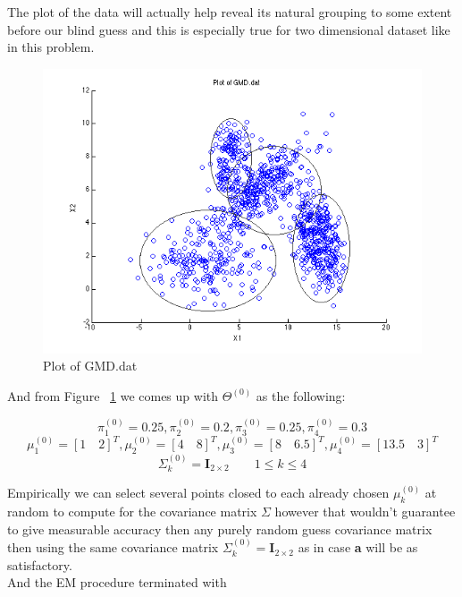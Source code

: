 \documentclass[a4paper]{article}
\begin{document}
The plot of the data will actually help reveal its natural grouping to some extent before our blind guess and this is especially true for two dimensional dataset like in this problem.

\begin{figure}[H]
  \centering
    \includegraphics[scale=.57]{images/GMD_dat.png}
  \caption{Plot of GMD.dat}
  \label{fig:GMD.dat}
\end{figure}

And from Figure ~\ref{fig:GMD.dat} we comes up with $\Theta^{(0)}$ as the following:

$$ \pi_1^{(0)} = 0.25, \pi_2^{(0)} = 0.2, \pi_3^{(0)} = 0.25, \pi_4^{(0)} = 0.3 $$
$$ \mu_1^{(0)} = [1\quad2]^T, \mu_2^{(0)} = [4\quad8]^T, \mu_3^{(0)} = [8\quad6.5]^T, \mu_4^{(0)} = [13.5\quad3]^T $$
$$ \Sigma_k^{(0)} = \mathbf{I}_{2\times2} \qquad 1 \le k \le 4 $$

Empirically we can select several points closed to each already chosen $\mu_k^{(0)}$ at random to compute for the covariance matrix $\Sigma$ however that wouldn't guarantee to give measurable accuracy then any purely random guess covariance matrix then using the same covariance matrix $\Sigma_k^{(0)} = \mathbf{I}_{2\times2}$ as in case \textbf{a} will be as satisfactory.\\

And the EM procedure terminated with
\end{document}

